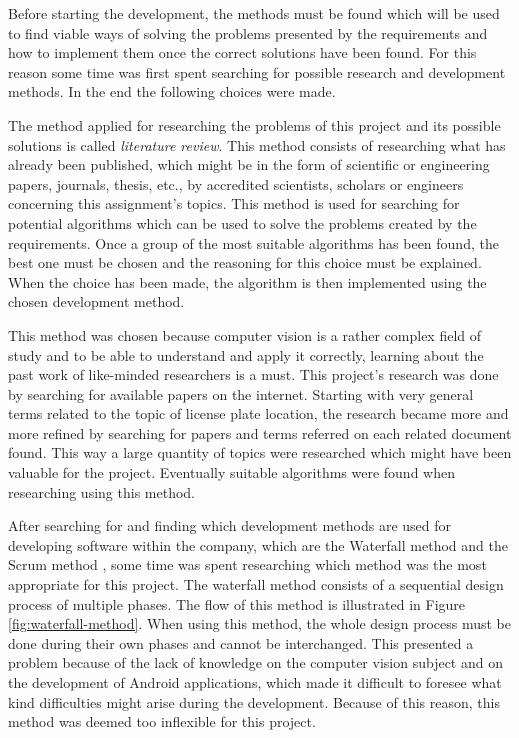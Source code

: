 
Before starting the development, the methods must be found which will be used to find viable ways of solving the problems presented by the requirements and how to implement them once the correct solutions have been found. For this reason some time was first spent searching for possible research and development methods. In the end the following choices were made.


The method applied for researching the problems of this project and its possible solutions is called \emph{literature review}. This method consists of researching what has already been published, which might be in the form of scientific or engineering papers, journals, thesis, etc., by accredited scientists, scholars or engineers concerning this assignment's topics. 
This method is used for searching for potential algorithms which can be used to solve the problems created by the requirements. Once a group of the most suitable algorithms has been found, the best one must be chosen and the reasoning for this choice must be explained. When the choice has been made, the algorithm is then implemented using the chosen development method.

This method was chosen because computer vision is a rather complex field of study and to be able to understand and apply it correctly, learning about the past work of like-minded researchers is a must. This project's research was done by searching for available papers on the internet. Starting with very general terms related to the topic of license plate location, the research became more and more refined by searching for papers and terms referred on each related document found. This way a large quantity of topics were researched which might have been valuable for the project. Eventually suitable algorithms were found when researching using this method.


After searching for and finding which development methods are used for developing software within the company, which are the Waterfall method \cite{royce1970managing} and the Scrum method \cite{scrum-guide}, some time was spent researching which method was the most appropriate for this project. The waterfall method consists of a sequential design process of multiple phases. The flow of this method is illustrated in Figure \ref{fig:waterfall-method}. When using this method, the whole design process must be done during their own phases and cannot be interchanged. This presented a problem because of the lack of knowledge on the computer vision subject and on the development of Android applications, which made it difficult to foresee what kind difficulties might arise during the development. Because of this reason, this method was deemed too inflexible for this project.

